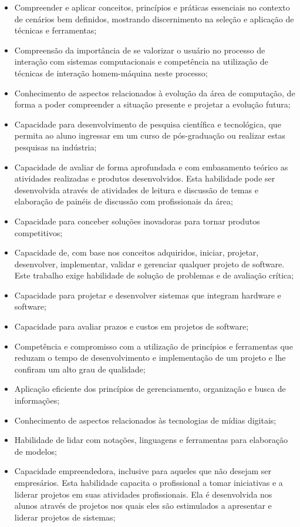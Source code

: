 \documentclass[
	12pt,				%
	openright,			%
  oneside,     %
	a4paper,			%
	chapter=TITLE,		%
	english,			%
	french,				%
	spanish,			%
	brazil				%
	]{abntex2}
\begin{document}
\begin{itemize}
    \item Compreender e aplicar conceitos, princípios e práticas essenciais no contexto de cenários bem definidos, mostrando discernimento na seleção e aplicação de técnicas e ferramentas;
    \item Compreensão da importância de se valorizar o  usuário  no  processo  de  interação com sistemas computacionais e competência na utilização de técnicas de interação homem-máquina neste processo;
    \item Conhecimento de aspectos relacionados à evolução da área de computação, de forma a poder compreender a situação presente e projetar a evolução futura;
    \item Capacidade para desenvolvimento de pesquisa científica e tecnológica, que permita ao aluno ingressar em um curso de pós-graduação ou realizar estas pesquisas na indústria;
    \item Capacidade de avaliar de forma aprofundada e com embasamento teórico as atividades realizadas e produtos desenvolvidos. Esta habilidade pode ser desenvolvida através de atividades de leitura e discussão de temas e elaboração de painéis de discussão com profissionais da área;
    \item Capacidade para conceber soluções inovadoras para tornar produtos competitivos;
    \item Capacidade de, com base nos conceitos adquiridos, iniciar, projetar, desenvolver, implementar, validar e gerenciar qualquer projeto de software. Este trabalho exige habilidade de solução de problemas e de avaliação crítica;
    \item Capacidade para projetar e desenvolver sistemas que integram hardware e software;
    \item Capacidade para avaliar prazos e custos em projetos de software;
    \item Competência e compromisso com a utilização de princípios e ferramentas que reduzam o tempo de desenvolvimento e implementação de um projeto e lhe confiram um alto grau de qualidade;
    \item Aplicação eficiente dos princípios de gerenciamento, organização e busca de informações;
    \item Conhecimento de aspectos relacionados às tecnologias de mídias digitais;
    \item Habilidade de lidar com notações, linguagens e ferramentas para elaboração de modelos;
    \item Capacidade empreendedora, inclusive para aqueles que não desejam ser empresários. Esta habilidade capacita o profissional a tomar iniciativas e a liderar projetos em suas atividades profissionais. Ela é desenvolvida nos alunos através de projetos nos quais eles são estimulados a apresentar e liderar projetos de sistemas;

\end{itemize}
\end{document}
